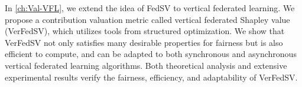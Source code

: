 In \autoref{ch:Val-VFL}, we extend the idea of FedSV to vertical federated learning. We propose a contribution valuation metric called vertical federated Shapley value (VerFedSV), which utilizes tools from structured optimization. We show that VerFedSV not only satisfies many desirable properties for fairness but is also efficient to compute, and can be adapted to both synchronous and asynchronous vertical federated learning algorithms. Both theoretical analysis and extensive experimental results verify the fairness, efficiency, and adaptability of VerFedSV.




